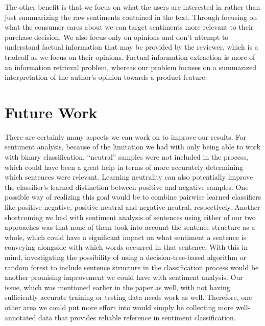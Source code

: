 \documentclass{article}
\begin{document}
The other benefit is that we focus on what the users are interested in rather than just summarizing the raw sentiments contained in the text. Through focusing on what the consumer cares about we can target sentiments more relevant to their purchase decision. We also focus only on opinions and don’t attempt to understand factual information that may be provided by the reviewer, which is a tradeoff as we focus on their opinions. Factual information extraction is more of an information retrieval problem, whereas our problem focuses on a summarized interpretation of the author’s opinion towards a product feature.

\section{Future Work}
There are certainly many aspects we can work on to improve our results. For sentiment analysis, because of the limitation we had with only being able to work with binary classification, “neutral” samples were not included in the process, which could have been a great help in terms of more accurately determining which sentences were relevant. Learning neutrality can also potentially improve the classifier’s learned distinction between positive and negative samples. One possible way of realizing this goal would be to combine pairwise learned classifiers like positive-negative, positive-neutral and negative-neutral,
respectively. Another shortcoming we had with sentiment analysis of sentences using either of our two approaches was that none of them took into account the sentence structure as a whole, which could have a significant impact on what sentiment a sentence is conveying alongside with which words occurred in that sentence. With this in mind, investigating the possibility of using a decision-tree-based algorithm or random forest to include sentence structure in the classification process would be another promising improvement we could have with sentiment analysis. Our issue, which was mentioned earlier in the paper as well, with not having sufficiently accurate training or testing data needs work as well. Therefore, one other area we could put more effort into would simply be collecting more well-annotated data that provides reliable reference in sentiment classification.
\end{document}
